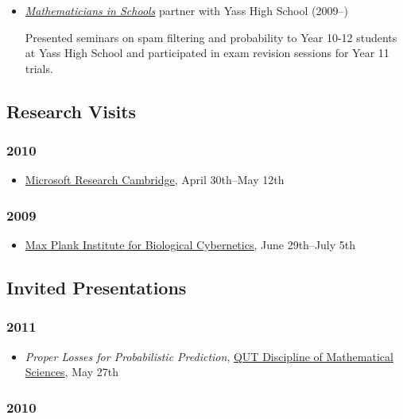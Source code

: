 \documentclass{article}
\begin{document}
\begin{itemize}%
\item \emph{\href{http://www.mathematiciansinschools.edu.au/}{Mathematicians in Schools}} partner with Yass High School (2009--{})

Presented seminars on spam filtering and probability to Year 10-12 students at Yass High School and participated in exam revision sessions for Year 11 trials.



\end{itemize}
\hypertarget{research_visits}{}\subsection*{{Research Visits}}\label{research_visits}

\hypertarget{2010}{}\subsubsection*{{2010}}\label{2010}

\begin{itemize}%
\item \href{http://research.microsoft.com/en-us/labs/cambridge/default.aspx}{Microsoft Research Cambridge}, April 30th--{}May 12th

\end{itemize}
\hypertarget{2009}{}\subsubsection*{{2009}}\label{2009}

\begin{itemize}%
\item \href{http://www.kyb.mpg.de/}{Max Plank Institute for Biological Cybernetics}, June 29th--{}July 5th

\end{itemize}
\hypertarget{invited_presentations}{}\subsection*{{Invited Presentations}}\label{invited_presentations}

\hypertarget{2011}{}\subsubsection*{{2011}}\label{2011}

\begin{itemize}%
\item \emph{Proper Losses for Probabilistic Prediction}, \href{http://www.scitech.qut.edu.au/about/disciplines/mathsci/}{QUT Discipline of Mathematical Sciences}, May 27th

\end{itemize}
\hypertarget{2010}{}\subsubsection*{{2010}}\label{2010}
\end{document}
